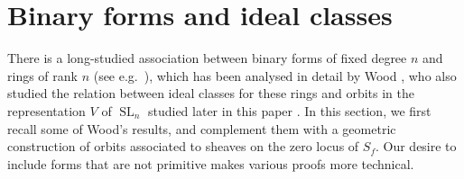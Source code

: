 \documentclass{article} %
\newcommand{\jack}[1]{{\color{blue} \sf $\clubsuit\clubsuit\clubsuit$ Jack: [#1]}}
\numberwithin{equation}{section}
\DeclareMathOperator{\SL}{SL}
\begin{document}
\section{Binary forms and ideal classes}\label{sec_binary_forms}
There is a long-studied association between binary forms of fixed degree $n$ and rings of rank $n$ (see e.g.\ \cite{Nak89}), which has been analysed in detail by Wood \cite{Woo11}, who also studied the relation between ideal classes for these rings and orbits in the representation $V$ of $\SL_n$ studied later in this paper \cite{Woo14}. In this section, we first recall some of Wood's results, and complement them with a geometric construction of orbits associated to sheaves on the zero locus of $S_f$. 
Our desire to include forms that are not primitive makes various proofs more technical.
\end{document}
